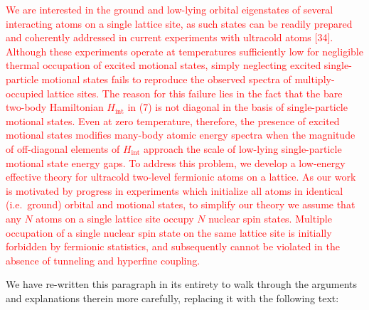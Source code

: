 \documentclass[preprint]{revtex4-1}
\renewcommand{\t}{\text} %
\newcommand{\1}{\mathds{1}}
\newcommand{\red}[1]{\textcolor{red}{#1}}
\begin{document}
\begin{enumerate}
  \red{We are interested in the ground and low-lying orbital
    eigenstates of several interacting atoms on a single lattice site,
    as such states can be readily prepared and coherently addressed in
    current experiments with ultracold atoms [34].  Although these
    experiments operate at temperatures sufficiently low for
    negligible thermal occupation of excited motional states, simply
    neglecting excited single-particle motional states fails to
    reproduce the observed spectra of multiply-occupied lattice sites.
    The reason for this failure lies in the fact that the bare
    two-body Hamiltonian $H_{\t{int}}$ in (7) is not diagonal in the
    basis of single-particle motional states.  Even at zero
    temperature, therefore, the presence of excited motional states
    modifies many-body atomic energy spectra when the magnitude of
    off-diagonal elements of $H_{\t{int}}$ approach the scale of
    low-lying single-particle motional state energy gaps.  To address
    this problem, we develop a low-energy effective theory for
    ultracold two-level fermionic atoms on a lattice.  As our work is
    motivated by progress in experiments which initialize all atoms in
    identical (i.e.~ground) orbital and motional states, to simplify
    our theory we assume that any $N$ atoms on a single lattice site
    occupy $N$ nuclear spin states.  Multiple occupation of a single
    nuclear spin state on the same lattice site is initially forbidden
    by fermionic statistics, and subsequently cannot be violated in
    the absence of tunneling and hyperfine coupling.}

  We have re-written this paragraph in its entirety to walk through
  the arguments and explanations therein more carefully, replacing it
  with the following text:


\end{enumerate}
\end{document}
